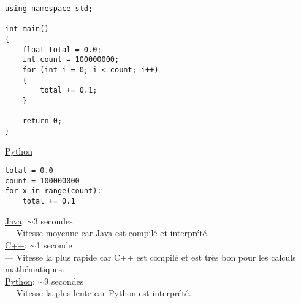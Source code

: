 \documentclass[12pt]{book}
\begin{document}
\begin{enumerate}
\begin{verbatim}
using namespace std;

int main()
{
    float total = 0.0;
    int count = 100000000;
    for (int i = 0; i < count; i++)
    { 
        total += 0.1; 
    } 

    return 0;
}
\end{verbatim}

\underline{Python}
\begin{verbatim}
total = 0.0
count = 100000000
for x in range(count): 
    total += 0.1
\end{verbatim}

\underline{Java}: $\sim$3 secondes\\
--- Vitesse moyenne car Java est compilé et interprété.\\
\underline{C++}: $\sim$1 seconde\\
--- Vitesse la plus rapide car C++ est compilé et est très bon pour les calculs mathématiques.\\
\underline{Python}: $\sim$9 secondes\\
--- Vitesse la plus lente car Python est interprété.






\end{enumerate}
\end{document}
